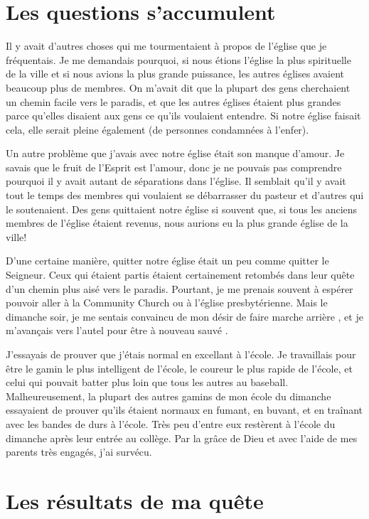 \section*{Les questions s'accumulent}

Il y avait d'autres choses qui me tourmentaient à propos de l'église que je fréquentais. Je me demandais pourquoi, si nous étions l'église la plus spirituelle de la ville et si nous avions la plus grande puissance, les autres églises avaient beaucoup plus de membres. On m'avait dit que la plupart des gens cherchaient un chemin facile vers le paradis, et que les autres églises étaient plus grandes parce qu'elles disaient aux gens ce qu'ils voulaient entendre. Si notre église faisait cela, elle serait pleine également (de personnes condamnées à l'enfer).

Un autre problème que j'avais avec notre église était son manque d'amour. Je savais que le fruit de l'Esprit est l'amour, donc je ne pouvais pas comprendre pourquoi il y avait autant de séparations dans l'église. Il semblait qu'il y avait tout le temps des membres qui voulaient se débarrasser du pasteur et d'autres qui le soutenaient. Des gens quittaient notre église si souvent que, si tous les anciens membres de l'église étaient revenus, nous aurions eu la plus grande église de la ville!

D'une certaine manière, quitter notre église était un peu comme quitter le Seigneur. Ceux qui étaient partis étaient certainement retombés dans leur quête d'un chemin plus aisé vers le paradis. Pourtant, je me prenais souvent à espérer pouvoir aller à la Community Church ou à l'église presbytérienne. Mais le dimanche soir, je me sentais convaincu de mon désir de \og faire marche arrière \fg{}, et je m'avançais vers l'autel pour être à nouveau \og sauvé \fg{}.

J'essayais de prouver que j'étais normal en excellant à l'école. Je travaillais pour être le gamin le plus intelligent de l'école, le coureur le plus rapide de l'école, et celui qui pouvait batter plus loin que tous les autres au baseball. Malheureusement, la plupart des autres gamins de mon école du dimanche essayaient de prouver qu'ils étaient normaux en fumant, en buvant, et en traînant avec les bandes de durs à l'école. Très peu d'entre eux restèrent à l'école du dimanche après leur entrée au collège. Par la grâce de Dieu et avec l'aide de mes parents très engagés, j'ai survécu.

\section*{Les résultats de ma quête}

